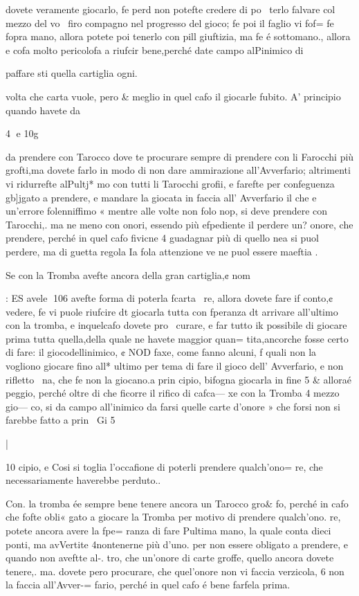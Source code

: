 \documentclass[12pt,a6paper]{article}
\begin{document}
dovete veramente giocarlo, fe
perd non potefte credere di po~
terlo falvare col mezzo del vo~
firo compagno nel progresso
del gioco; fe poi il faglio vi fof=
fe fopra mano, allora potete poi
tenerlo con pill giuftizia, ma fe
é sottomano., allora e cofa molto pericolofa a riufcir bene,perché date campo alPinimico di

 

paffare sti quella cartiglia ogni.

volta che carta vuole, pero &
meglio in quel cafo il giocarle
fubito.
A’ principio quando havete
da

4
e
10g

da prendere con Tarocco dove
te procurare sempre di prendere con li Farocchi più grofti,ma
dovete farlo in modo di non dare ammirazione all’Avverfario;
altrimenti vi ridurrefte alPultj* mo con tutti li Tarocchi grofii,
e farefte per confeguenza gb]jgato a prendere, e mandare la
giocata in faccia all’ Avverfario
il che e un’errore folenniffimo «
mentre alle volte non folo nop,
si deve prendere con Tarocchi,.
ma ne meno con onori, essendo
più efpediente il perdere un?
onore, che prendere, perché in
quel cafo fivicne 4 guadagnar
più di quello nea si puol perdere, ma di guetta regola Ia fola
attenzione ve ne puol essere
maeftia .

Se con la Tromba avefte ancora della gran cartiglia,¢ nom

: ES avele
106
avefte forma di poterla fcarta~
re, allora dovete fare if conto,¢
vedere, fe vi puole riufcire dt
giocarla tutta con fperanza dt
arrivare all’ultimo con la tromba, e inquelcafo dovete pro~
curare, e far tutto ik possibile di
giocare prima tutta quella,della
quale ne havete maggior quan=
tita,ancorche fosse certo di fare:
il giocodellinimico, ¢ NOD faxe, come fanno alcuni, f quali
non la vogliono giocare fino all*
ultimo per tema di fare il gioco
dell’ Avverfario, e non rifletto~ 
na, che fe non la giocano.a prin
cipio, bifogna giocarla in fine 5
& alloraé peggio, perché oltre
di che ficorre il rifico di cafca—
xe con la Tromba 4 mezzo gio—
co, si da campo all’inimico da
farsi quelle carte d’onore » che
forsi non si farebbe fatto a prin~
Gi 5

|
 

10
cipio, e Cosi si toglia l’occafione
di poterli prendere qualch’ono=
re, che necessariamente haverebbe perduto..

Con. la tromba ée sempre bene
tenere ancora un Tarocco gro&
fo, perché in cafo che fofte obli«
gato a giocare la Tromba per
motivo di prendere qualch’ono.
re, potete ancora avere la fpe=
ranza di fare Pultima mano, la
quale conta dieci ponti, ma avVertite 4nontenerne più d’uno.
per non essere obligato a prendere, e quando non aveftte al-.
tro, che un’onore di carte groffe, quello ancora dovete tenere,.
ma. dovete pero procurare, che
quel’onore non vi faccia verzicola, 6 non la faccia all’Avver-=
fario, perché in quel cafo é bene farfela prima.
\end{document}
